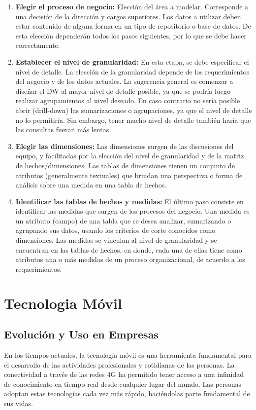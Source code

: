 \documentclass[letter,12pt,oneside]{report}
\begin{document}
\begin{enumerate}
\item\textbf{Elegir el proceso de negocio: }Elección del área a modelar. Corresponde a una decisión de la dirección y cargos superiores. Los datos a utilizar deben estar contenido de alguna forma en un tipo de repositorio o base de datos. De esta elección dependerán todos los pasos siguientes, por lo que se debe hacer correctamente. 
\item\textbf{Establecer el nivel de granularidad: }En esta etapa, se debe especificar el nivel de detalle. La elección de la granularidad depende de los requerimientos del negocio y de los datos actuales. La sugerencia general es comenzar a diseñar el DW al mayor nivel de detalle posible, ya que se podría luego realizar agrupamientos al nivel deseado. En caso contrario no sería posible abrir (drill-down) las sumarizaciones o agrupaciones, ya que el nivel de detalle no lo permitiría. Sin embargo, tener mucho nivel de detalle también haría que las consultas fueran más lentas.
\item\textbf{Elegir las dimensiones: }Las dimensiones surgen de las discusiones del equipo, y facilitadas por la elección del nivel de granularidad y de la matriz de hechos/dimensiones. Las tablas de dimensiones tienen un conjunto de atributos (generalmente textuales) que brindan una perspectiva o forma de análisis sobre una medida en una tabla de hechos. 
\item\textbf{Identificar las tablas de hechos y medidas: }El último paso consiste en identificar las medidas que surgen de los procesos del negocio. Una medida es un atributo (campo) de una tabla que se desea analizar, sumarizando o agrupando sus datos, usando los criterios de corte conocidos como dimensiones. Las medidas se vinculan al nivel de granularidad y se encuentran en las tablas de hechos, en donde, cada una de ellas tiene como atributos una o más medidas de un proceso organizacional, de acuerdo a los requerimientos.
\end{enumerate}

\section{Tecnologia Móvil}
\subsection{Evolución y Uso en Empresas}
En los tiempos actuales, la tecnología móvil es una herramienta fundamental para el desarrollo de las actividades profesionales y cotidianas de las personas. La conectividad a través de las redes 4G ha permitido tener acceso a una infinidad de conocimiento en tiempo real desde cualquier lugar del mundo. Las personas adoptan estas tecnologías cada vez más rápido, haciéndolas parte fundamental de sus vidas\cite{P6}.
\end{document}
